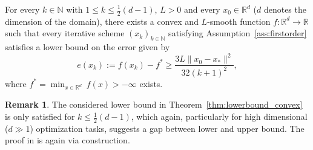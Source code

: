 \documentclass[12pt,openany]{book}
\theoremstyle{definition}
\newtheorem{remark}[thm]{Remark}
\theoremstyle{definition}
\newcommand{\N}{\mathbb{N}}
\newcommand{\R}{\mathbb{R}}
\begin{document}
\begin{thm}\label{thm:lowerbound_convex}
For every $k\in\N$ with $1\le k \le \frac{1}{2}(d-1)$, $L>0$ and every $x_0\in\R^d$ ($d$ denotes the dimension of the domain), there exists a convex and $L$-smooth function $f:\R^d\to\R$ such that every iterative scheme $(x_k)_{k\in\N}$ satisfying Assumption~\ref{ass:firstorder} satisfies  a lower bound on the error given by
\[e(x_k) := f(x_k)-f^\ast \ge \frac{3L\|x_0-x_\ast\|^2}{32(k+1)^2}, \]
where $f^\ast = \min_{x\in\R^d}\ f(x)>-\infty$ exists.
\end{thm}

\begin{remark}
The considered lower bound in Theorem~\ref{thm:lowerbound_convex} is only satisfied for $k\le \frac{1}{2}(d-1)$, which again, particularly for high dimensional ($d\gg 1$) optimization tasks, suggests a gap between lower and upper bound.  The proof in \cite{N2018} is again via construction.
\end{remark}
\end{document}
